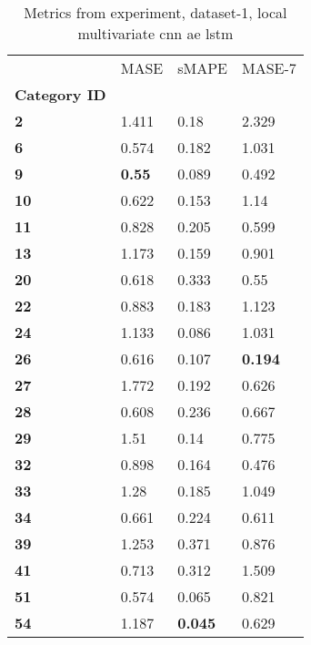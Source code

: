 \begin{table}[H]
\centering
\caption{Metrics from experiment, dataset-1, local multivariate cnn ae lstm}
\label{table:local-multivariate-cnn-ae-lstm-dataset-1}
\begin{tabular}{llll}
\toprule
{} &           MASE &           sMAPE &          MASE-7 \\
\textbf{Category ID} &                &                 &                 \\
\midrule
\textbf{2          } &          1.411 &            0.18 &           2.329 \\
\textbf{6          } &          0.574 &           0.182 &           1.031 \\
\textbf{9          } &  \textbf{0.55} &           0.089 &           0.492 \\
\textbf{10         } &          0.622 &           0.153 &            1.14 \\
\textbf{11         } &          0.828 &           0.205 &           0.599 \\
\textbf{13         } &          1.173 &           0.159 &           0.901 \\
\textbf{20         } &          0.618 &           0.333 &            0.55 \\
\textbf{22         } &          0.883 &           0.183 &           1.123 \\
\textbf{24         } &          1.133 &           0.086 &           1.031 \\
\textbf{26         } &          0.616 &           0.107 &  \textbf{0.194} \\
\textbf{27         } &          1.772 &           0.192 &           0.626 \\
\textbf{28         } &          0.608 &           0.236 &           0.667 \\
\textbf{29         } &           1.51 &            0.14 &           0.775 \\
\textbf{32         } &          0.898 &           0.164 &           0.476 \\
\textbf{33         } &           1.28 &           0.185 &           1.049 \\
\textbf{34         } &          0.661 &           0.224 &           0.611 \\
\textbf{39         } &          1.253 &           0.371 &           0.876 \\
\textbf{41         } &          0.713 &           0.312 &           1.509 \\
\textbf{51         } &          0.574 &           0.065 &           0.821 \\
\textbf{54         } &          1.187 &  \textbf{0.045} &           0.629 \\
\bottomrule
\end{tabular}
\end{table}
